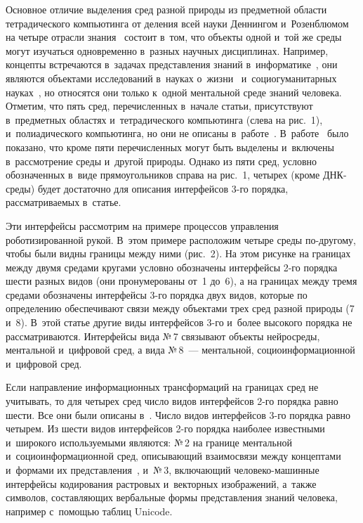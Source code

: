 \begin{multicols}{2}
  Основное отличие выделения сред разной природы из предметной области 
тетрадического компьютинга от деления всей науки Деннингом и~Розенблюмом 
на четыре отрасли знания~\cite{13-zat} состоит в~том, что объекты одной и~той 
же среды могут изучать\-ся одновременно в~разных научных дис\-цип\-ли\-нах. 
Например, концепты встречаются в~задачах пред\-став\-ле\-ния знаний 
в~информатике~\cite{15-zat, 16-zat, 17-zat}, они являются объектами 
исследований в~науках о~жиз\-ни~\cite{18-zat} и~со\-цио\-гу\-ма\-ни\-тар\-ных 
науках~\cite{19-zat}, но относятся они только к~одной ментальной среде знаний 
человека. Отметим, что пять сред, перечисленных в~начале статьи, 
присутствуют в~предметных областях и~тетрадического компьютинга (слева на 
рис.~1), и~полиадического компьютинга, но они не описаны  
в~работе~\cite{12-zat}. В~работе~\cite{15-zat} было показано, что кроме пяти 
перечисленных могут быть выделены и~включены в~рассмотрение среды 
и~другой природы. Однако из пяти сред, условно обозначенных в~виде 
прямоугольников справа на рис.~1, четырех (кроме ДНК-сре\-ды) будет 
достаточно для описания интерфейсов 3-го порядка, рассматриваемых в~статье.
  
  Эти интерфейсы рассмотрим на примере процессов управления 
роботизированной рукой. 
%
В~этом примере расположим четыре среды по-дру\-го\-му, 
чтобы были видны границы между ними (рис.~2). На этом рисунке на 
границах между двумя средами кругами условно обозначены интерфейсы 2-го 
порядка шести разных видов (они пронумерованы от~1 до~6), а на границах 
между тремя средами обозначены интерфейсы 3-го порядка двух видов, 
которые по определению обеспечивают связи между объектами трех сред 
разной природы (7 и~8). В~этой статье другие виды интерфейсов \mbox{3-го} и~более 
высокого порядка не рассматриваются. Интерфейсы вида №\,7 связывают 
объекты нейросреды, ментальной и~цифровой сред, а вида №\,8~--- ментальной,  
со\-цио\-ин\-фор\-ма\-ци\-он\-ной и~цифровой сред.
  
  Если направление информационных трансформаций на границах сред не 
учитывать, то для четырех сред число видов интерфейсов 2-го порядка равно 
шести. Все они были описаны в~\cite{15-zat}. Число видов интерфейсов 3-го 
порядка равно четырем. Из шести видов интерфейсов 2-го порядка наиболее 
известными и~широкого используемыми являются: №\,2 на границе ментальной 
и~со\-цио\-ин\-фор\-ма\-ци\-он\-ной сред, описывающий взаимосвязи между 
концептами и~формами их пред\-став\-ле\-ния~\cite{19-zat}, и~№\,3, вклю\-ча\-ющий  
че\-ло\-ве\-ко-ма\-шин\-ные интерфейсы кодирования растровых и~векторных 
изображений, а~также символов, со\-став\-ля\-ющих
вербальные формы пред\-став\-ле\-ния знаний 
человека, например с~по\-мощью таб\-лиц Unicode.
  

\end{multicols}
